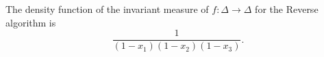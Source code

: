 
The density function of the invariant measure of $f:\Delta\to\Delta$ for
the Reverse algorithm is
\[
\frac{1}{(1-x_1)(1-x_2)(1-x_3)}.
\]
